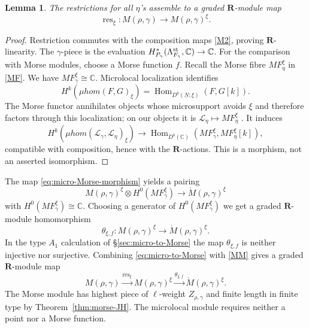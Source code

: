 \documentclass[11pt,reqno]{amsart}
\newtheorem{Lemma}[Theorem]{Lemma}
\theoremstyle{definition}
\theoremstyle{remark}
\def\bbC{\mathbb C}
\def\dN{\underline N}
\def\Hom{\operatorname{Hom}}
\def\muhom{\mu hom}
\def\bR{\mathbf R}
\begin{document}
\begin{Lemma}
The restrictions for all $\eta$'s assemble to a graded $\bR$-module map
\begin{equation}\label{MM}
 \operatorname{res}_\xi:
 M(\rho,\gamma)\longrightarrow M(\rho,\gamma)^\xi.
\end{equation}
\end{Lemma}

\begin{proof}
Restriction commutes with the composition maps \ref{M2}, proving $\bR$-linearity.
The $\gamma$-piece is the evaluation $H^*_{P_\gamma}(\Lambda^{\rm st}_{F_\gamma},\bbC)\to\bbC$.
For the comparison with Morse modules, choose a Morse function $f$.
Recall the Morse fibre $MF^\xi_\eta$ in \eqref{MF}.
We have  $MF^\xi_\gamma\cong\bbC$.
Microlocal localization \cite[Ch.~VI]{KS90} identifies
\[
 H^k(\muhom(F,G)_\xi)
 =\Hom_{D^b(\dN;\xi)}(F,G[k]).
\]
The Morse functor annihilates objects whose microsupport avoids
$\xi$ and therefore factors through this localization; on our
objects it is $\mathscr L_\eta\mapsto MF^\xi_\eta$
\cite[\S8.6]{KS90}. It induces
\begin{equation}\label{eq:micro-Morse-morphism}
 H^k(\muhom(\mathscr L_\gamma,\mathscr L_\eta)_\xi)
 \longrightarrow\Hom_{D^b(\bbC)}(MF^\xi_\gamma,MF^\xi_\eta[k]),
\end{equation}
compatible with composition, hence with the $\bR$-actions.
This is a morphism, not an asserted isomorphism.
\end{proof}



The map \eqref{eq:micro-Morse-morphism} yields a pairing
$$M(\rho,\gamma)^\xi\otimes H^0(MF^\xi_\gamma)
\to\mathring M(\rho,\gamma)^\xi$$
with $H^0(MF^\xi_\gamma)\cong\mathbb C$. 
Choosing a generator of $H^0(MF^\xi_\gamma)$ we get a graded $\bR$-module homomorphism
\begin{equation}\label{eq:micro-to-Morse}
 \theta_{\xi,f}:M(\rho,\gamma)^\xi
 \longrightarrow\mathring M(\rho,\gamma)^\xi.
\end{equation}
In the type $A_1$ calculation of
\S\ref{sec:micro-to-Morse}
the map $\theta_{\xi,f}$ is neither injective nor surjective.
Combining \eqref{eq:micro-to-Morse} with \eqref{MM} gives a graded $\bR$-module map
\begin{equation}\label{eq:global-micro-to-Morse}
 M(\rho,\gamma)\xrightarrow{\operatorname{res}_\xi}
 M(\rho,\gamma)^\xi\xrightarrow{\theta_{\xi,f}}
 \mathring M(\rho,\gamma)^\xi.
\end{equation}
The Morse module has highest piece of $\ell$-weight $Z_{\rho,\gamma}$
and finite length in finite type by Theorem~\ref{thm:morse-JH}. 
The microlocal module requires neither a point nor a Morse function.
\end{document}
